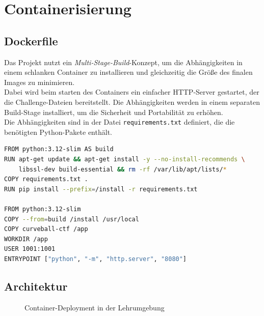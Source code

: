 \documentclass{article}
\begin{document}
\newpage

\section{Containerisierung}
\subsection{Dockerfile}

Das Projekt nutzt ein \emph{Multi-Stage-Build}-Konzept, um die Abhängigkeiten in einem schlanken Container zu installieren und gleichzeitig die Größe des finalen Images zu minimieren. \\
Dabei wird beim starten des Containers ein einfacher HTTP-Server gestartet, der die Challenge-Dateien bereitstellt.
Die Abhängigkeiten werden in einem separaten Build-Stage installiert, um die Sicherheit und Portabilität zu erhöhen. \\
Die Abhängigkeiten sind in der Datei \texttt{requirements.txt} definiert, die die benötigten Python-Pakete enthält.

\vspace{1cm}

\begin{lstlisting}[language=bash,caption={Auszug aus dem finalen Dockerfile}]
FROM python:3.12-slim AS build
RUN apt-get update && apt-get install -y --no-install-recommends \
    libssl-dev build-essential && rm -rf /var/lib/apt/lists/*
COPY requirements.txt .
RUN pip install --prefix=/install -r requirements.txt

FROM python:3.12-slim
COPY --from=build /install /usr/local
COPY curveball-ctf /app
WORKDIR /app
USER 1001:1001
ENTRYPOINT ["python", "-m", "http.server", "8080"]
\end{lstlisting}

\subsection{Architektur}
\begin{figure}[H]
  \centering
  \caption{Container-Deployment in der Lehrumgebung}\label{fig:container}
\end{figure}
\end{document}
